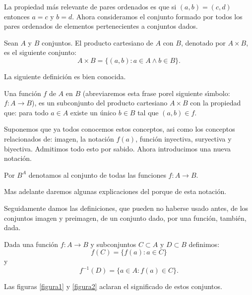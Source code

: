 La propiedad m\'as relevante de pares ordenados es que si
$(a,b)=(c,d)$ entonces $a=c$ y $b=d$. Ahora consideramos el
conjunto formado por todos los pares ordenados de elementos
pertenecientes a conjuntos dados.

\begin{definicion} Sean $A$ y $B$ conjuntos. El producto cartesiano de $A$ con
$B$, denotado por $A\times B$, es el siguiente conjunto:
\[A\times B=\{(a,b):a\in A\wedge b\in B\}.\]
\end{definicion}
La siguiente definici\'on es bien conocida.

\begin{definicion} Una funci\'on $f$ de $A$ en $B$ (abreviaremos esta frase
porel siguiente s\'{\i}mbolo: $f:A\longrightarrow B$), es un
subconjunto del producto cartesiano $A\times B$ con la propiedad
que: para todo $a\in A$ existe un \'unico $b\in B$ tal que
$(a,b)\in f$. \end{definicion}

Suponemos que ya todos conocemos estos conceptos, asi como los
conceptos relacionados de: imagen, la notaci\'on $f(a)$, funci\'on
inyectiva, suryectiva y biyectiva. Admitimos todo esto por sabido.
Ahora introducimos una nueva notaci\'on.

\begin{definicion}
Por $B^A$ denotamos al conjunto de todas las funciones
$f:A\longrightarrow B$.
\end{definicion}

Mas adelante daremos algunas explicaciones del porque de esta
notaci\'on.

Seguidamente damos las definiciones, que pueden no haberse usado
antes, de los conjuntos imagen y preimagen, de un conjunto dado,
por una funci\'on, tambi\'en, dada.

\begin{definicion} Dada una funci\'on $f:A\longrightarrow B$ y subconjuntos
$C\subset A$ y $D\subset B$ definimos:
\[f(C)=\{f(a):a\in C\}\]
y
\[f^{-1}(D)=\{a\in A:f(a)\in C\}.\]
\end{definicion}

Las figuras \vref{figura1} y \vref{figura2} aclaran el significado
de estos conjuntos.


